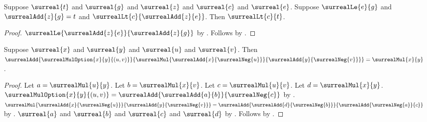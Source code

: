 \begin{lemma}\label{surreal_above_from_epsilon_gap}
    Suppose $\surreal{t}$ and $\surreal{g}$ and
        $\surreal{z}$ and $\surreal{c}$ and $\surreal{e}$.
    Suppose $\surrealLe{e}{g}$ and
        $\surrealAdd{z}{g}=t$ and
        $\surrealLt{c}{\surrealAdd{z}{e}}$.
    Then $\surrealLt{c}{t}$.
\end{lemma}
\begin{proof}
    $\surrealLe{\surrealAdd{z}{e}}{\surrealAdd{z}{g}}$
        by .
    Follows by
        .
\end{proof}

\begin{lemma}\label{surreal_mul_option_lower_gap_identity}
    Suppose $\surreal{x}$ and $\surreal{y}$ and
        $\surreal{u}$ and $\surreal{v}$.
    Then
        $\surrealAdd{\surrealMulOption{x}{y}{(u,v)}}
            {\surrealMul
                {\surrealAdd{x}{\surrealNeg{u}}}
                {\surrealAdd{y}{\surrealNeg{v}}}}
        =\surrealMul{x}{y}$.
\end{lemma}
\begin{proof}
    Let $a=\surrealMul{u}{y}$.
    Let $b=\surrealMul{x}{v}$.
    Let $c=\surrealMul{u}{v}$.
    Let $d=\surrealMul{x}{y}$.
    $\surrealMulOption{x}{y}{(u,v)}
        =\surrealAdd{\surrealAdd{a}{b}}{\surrealNeg{c}}$
        by .
    $\surrealMul
        {\surrealAdd{x}{\surrealNeg{u}}}
        {\surrealAdd{y}{\surrealNeg{v}}}
        =\surrealAdd{\surrealAdd{d}{\surrealNeg{b}}}
            {\surrealAdd{\surrealNeg{a}}{c}}$
        by
        .
    $\surreal{a}$ and $\surreal{b}$ and
        $\surreal{c}$ and $\surreal{d}$
        by .
    Follows by .
\end{proof}

